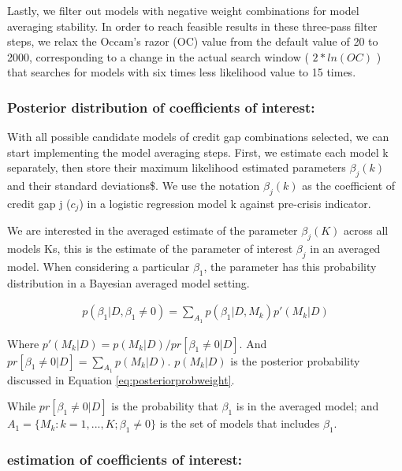 \documentclass[
  12pt,
]{article}
\begin{document}
Lastly, we filter out models with negative weight combinations for model averaging stability. In order to reach feasible results in these three-pass filter steps, we relax the Occam's razor (OC) value from the default value of 20 to 2000, corresponding to a change in the actual search window ( \(2*ln(OC)\) ) that searches for models with six times less likelihood value to 15 times.

\hypertarget{posterior-distribution-of-coefficients-of-interest}{%
\subsubsection{Posterior distribution of coefficients of interest:}\label{posterior-distribution-of-coefficients-of-interest}}

With all possible candidate models of credit gap combinations selected, we can start implementing the model averaging steps. First, we estimate each model k separately, then store their maximum likelihood estimated parameters \(\beta_j(k)\) and their standard deviations\$. We use the notation \(\beta_j(k)\) as the coefficient of credit gap j (\(c_j\)) in a logistic regression model k against pre-crisis indicator.

We are interested in the averaged estimate of the parameter \(\beta_j(K)\) across all models Ks, this is the estimate of the parameter of interest \(\beta_j\) in an averaged model. When considering a particular \(\beta_1\), the parameter has this probability distribution in a Bayesian averaged model setting.

\begin{align} \label{eq:postprob}
p(\beta_1|D, \beta_1\ne 0) = \sum\nolimits_{A_1} p(\beta_1|D,M_k)p'(M_k|D)
\end{align}

Where \(p'(M_k|D)=p(M_k|D)/ pr[\beta_1 \ne 0|D]\). And \(pr[\beta_1 \ne 0|D] = \sum\limits_{A_1} p(M_k|D)\). \(p(M_k|D)\) is the posterior probability discussed in Equation \eqref{eq:posteriorprobweight}.

While \(pr[\beta_1 \ne 0|D]\) is the probability that \(\beta_1\) is in the averaged model; and \(A_1= \{M_k: k=1,...,K; \beta_1 \ne 0\}\) is the set of models that includes \(\beta_1\).

\hypertarget{estimation-of-coefficients-of-interest}{%
\subsubsection{estimation of coefficients of interest:}\label{estimation-of-coefficients-of-interest}}
\end{document}
